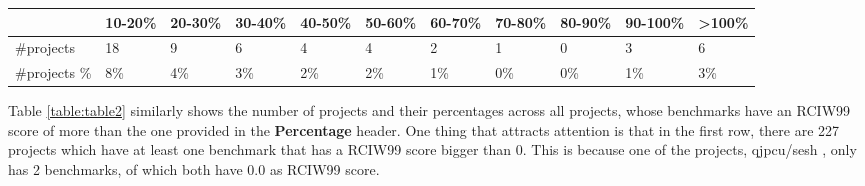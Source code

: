 \documentclass{seal_thesis}
\begin{document}
\begin{table}[H]
{\begin{tabular}{lllllllllll}
		\rowcolor[HTML]{FFFC9E} 
		\multicolumn{1}{|l|}{\cellcolor[HTML]{FFFC9E}Percentages} & \multicolumn{1}{l|}{\cellcolor[HTML]{FFFC9E}10-20\%} & \multicolumn{1}{l|}{\cellcolor[HTML]{FFFC9E}20-30\%} & \multicolumn{1}{l|}{\cellcolor[HTML]{FFFC9E}30-40\%} & \multicolumn{1}{l|}{\cellcolor[HTML]{FFFC9E}40-50\%} & \multicolumn{1}{l|}{\cellcolor[HTML]{FFFC9E}50-60\%} & \multicolumn{1}{l|}{\cellcolor[HTML]{FFFC9E}60-70\%} & \multicolumn{1}{l|}{\cellcolor[HTML]{FFFC9E}70-80\%} & \multicolumn{1}{l|}{\cellcolor[HTML]{FFFC9E}80-90\%} & \multicolumn{1}{l|}{\cellcolor[HTML]{FFFC9E}90-100\%} & \multicolumn{1}{l|}{\cellcolor[HTML]{FFFC9E}\textgreater{}100\%} \\ \hline
		\multicolumn{1}{|l|}{\#projects}                          & \multicolumn{1}{l|}{18}                              & \multicolumn{1}{l|}{9}                               & \multicolumn{1}{l|}{6}                               & \multicolumn{1}{l|}{4}                               & \multicolumn{1}{l|}{4}                               & \multicolumn{1}{l|}{2}                               & \multicolumn{1}{l|}{1}                               & \multicolumn{1}{l|}{0}                               & \multicolumn{1}{l|}{3}                                & \multicolumn{1}{l|}{6}                                           \\ \hline
		\multicolumn{1}{|l|}{\#projects \%}                       & \multicolumn{1}{l|}{8\%}                             & \multicolumn{1}{l|}{4\%}                             & \multicolumn{1}{l|}{3\%}                             & \multicolumn{1}{l|}{2\%}                             & \multicolumn{1}{l|}{2\%}                             & \multicolumn{1}{l|}{1\%}                             & \multicolumn{1}{l|}{0\%}                             & \multicolumn{1}{l|}{0\%}                             & \multicolumn{1}{l|}{1\%}                              & \multicolumn{1}{l|}{3\%}                                         \\ \hline
	\end{tabular}
	}
\end{table}

\noindent Table \ref{table:table2} similarly shows the number of projects and their percentages across all projects, whose benchmarks have an RCIW99 score of more than the one provided in the \textbf{Percentage} header. One thing that attracts attention is that in the first row, there are 227 projects which have at least one benchmark that has a RCIW99 score bigger than 0. This is because one of the projects, qjpcu/sesh \cite{qjpcu/sesh}, only has 2 benchmarks, of which both have 0.0 as RCIW99 score.
\end{document}
